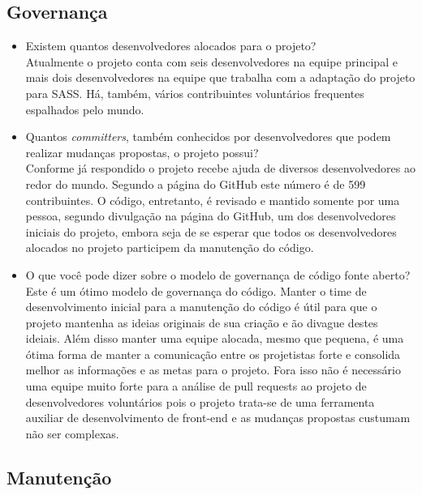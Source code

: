 \documentclass[12pt,a4paper]{article} %
\begin{document}
\subsection{Governança}


\begin{itemize}
\item Existem quantos desenvolvedores alocados para o projeto?\\
	Atualmente o projeto conta com seis desenvolvedores na equipe principal e mais dois desenvolvedores na equipe que trabalha com a adaptação do projeto para SASS. Há, também, vários contribuintes voluntários frequentes espalhados pelo mundo.

\item Quantos \textit{committers}, também conhecidos por desenvolvedores que podem realizar mudanças propostas, o projeto possui?\\
	Conforme já respondido o projeto recebe ajuda de diversos desenvolvedores ao redor do mundo. Segundo a página do GitHub este número é de 599 contribuintes. O código, entretanto, é revisado e mantido somente por uma pessoa, segundo divulgação na página do GitHub, um dos desenvolvedores iniciais do projeto, embora seja de se esperar que todos os desenvolvedores alocados no projeto participem da manutenção do código.
\item O que você pode dizer sobre o modelo de governança de código fonte aberto?\\
	Este é um ótimo modelo de governança do código. Manter o time de desenvolvimento inicial para a manutenção do código é útil para que o projeto mantenha as ideias originais de sua criação e ão divague destes ideiais. Além disso manter uma equipe alocada, mesmo que pequena, é uma ótima forma de manter a comunicação entre os projetistas forte e consolida melhor as informações e as metas para o projeto. Fora isso não é necessário uma equipe muito forte para a análise de pull requests ao projeto de desenvolvedores voluntários pois o projeto trata-se de uma ferramenta auxiliar de desenvolvimento de front-end e as mudanças propostas custumam não ser complexas.
\end{itemize}

\subsection{Manutenção}
\end{document}
